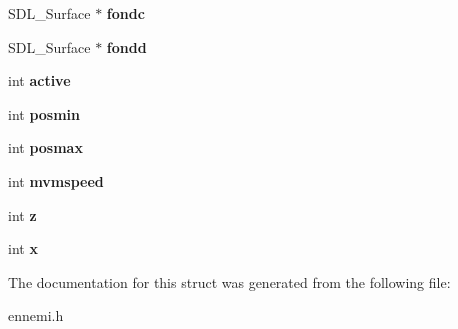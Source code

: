 \begin{DoxyCompactItemize}
S\+D\+L\+\_\+\+Surface $\ast$ {\bfseries fondc}
\item 
\mbox{\label{structennemis_ab982bb15caada636f5986421676d2183}} 
S\+D\+L\+\_\+\+Surface $\ast$ {\bfseries fondd}
\item 
\mbox{\label{structennemis_ad44f2c7a54b691c3f3cc510256939700}} 
int {\bfseries active}
\item 
\mbox{\label{structennemis_a346ebf1f4750af9f17b319c0866baf72}} 
int {\bfseries posmin}
\item 
\mbox{\label{structennemis_a71ee9866c26653b85099cfb9052557db}} 
int {\bfseries posmax}
\item 
\mbox{\label{structennemis_af075a9a9a64e296a56836d4dffda748f}} 
int {\bfseries mvmspeed}
\item 
\mbox{\label{structennemis_a713a84f00226c69f8b162ba2a4690c6f}} 
int {\bfseries z}
\item 
\mbox{\label{structennemis_a2dc78c4652791527589b6f4d30098075}} 
int {\bfseries x}
\end{DoxyCompactItemize}


The documentation for this struct was generated from the following file\+:\begin{DoxyCompactItemize}
\item 
ennemi.\+h\end{DoxyCompactItemize}
